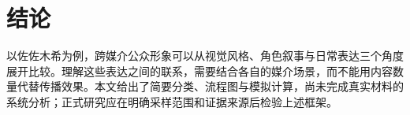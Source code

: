 \chapter*{结论}
以佐佐木希为例，跨媒介公众形象可以从视觉风格、角色叙事与日常表达三个角度展开比较。理解这些表达之间的联系，需要结合各自的媒介场景，而不能用内容数量代替传播效果。本文给出了简要分类、流程图与模拟计算，尚未完成真实材料的系统分析；正式研究应在明确采样范围和证据来源后检验上述框架。
